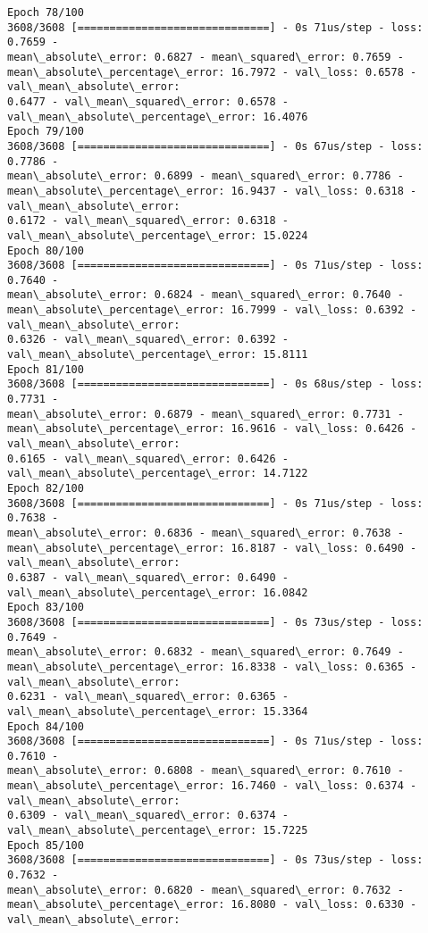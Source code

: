 \documentclass[11pt]{article}
\begin{document}
\begin{Verbatim}[commandchars=\\\{\},fontsize=\footnotesize]
Epoch 78/100
3608/3608 [==============================] - 0s 71us/step - loss: 0.7659 -
mean\_absolute\_error: 0.6827 - mean\_squared\_error: 0.7659 -
mean\_absolute\_percentage\_error: 16.7972 - val\_loss: 0.6578 - val\_mean\_absolute\_error:
0.6477 - val\_mean\_squared\_error: 0.6578 - val\_mean\_absolute\_percentage\_error: 16.4076
Epoch 79/100
3608/3608 [==============================] - 0s 67us/step - loss: 0.7786 -
mean\_absolute\_error: 0.6899 - mean\_squared\_error: 0.7786 -
mean\_absolute\_percentage\_error: 16.9437 - val\_loss: 0.6318 - val\_mean\_absolute\_error:
0.6172 - val\_mean\_squared\_error: 0.6318 - val\_mean\_absolute\_percentage\_error: 15.0224
Epoch 80/100
3608/3608 [==============================] - 0s 71us/step - loss: 0.7640 -
mean\_absolute\_error: 0.6824 - mean\_squared\_error: 0.7640 -
mean\_absolute\_percentage\_error: 16.7999 - val\_loss: 0.6392 - val\_mean\_absolute\_error:
0.6326 - val\_mean\_squared\_error: 0.6392 - val\_mean\_absolute\_percentage\_error: 15.8111
Epoch 81/100
3608/3608 [==============================] - 0s 68us/step - loss: 0.7731 -
mean\_absolute\_error: 0.6879 - mean\_squared\_error: 0.7731 -
mean\_absolute\_percentage\_error: 16.9616 - val\_loss: 0.6426 - val\_mean\_absolute\_error:
0.6165 - val\_mean\_squared\_error: 0.6426 - val\_mean\_absolute\_percentage\_error: 14.7122
Epoch 82/100
3608/3608 [==============================] - 0s 71us/step - loss: 0.7638 -
mean\_absolute\_error: 0.6836 - mean\_squared\_error: 0.7638 -
mean\_absolute\_percentage\_error: 16.8187 - val\_loss: 0.6490 - val\_mean\_absolute\_error:
0.6387 - val\_mean\_squared\_error: 0.6490 - val\_mean\_absolute\_percentage\_error: 16.0842
Epoch 83/100
3608/3608 [==============================] - 0s 73us/step - loss: 0.7649 -
mean\_absolute\_error: 0.6832 - mean\_squared\_error: 0.7649 -
mean\_absolute\_percentage\_error: 16.8338 - val\_loss: 0.6365 - val\_mean\_absolute\_error:
0.6231 - val\_mean\_squared\_error: 0.6365 - val\_mean\_absolute\_percentage\_error: 15.3364
Epoch 84/100
3608/3608 [==============================] - 0s 71us/step - loss: 0.7610 -
mean\_absolute\_error: 0.6808 - mean\_squared\_error: 0.7610 -
mean\_absolute\_percentage\_error: 16.7460 - val\_loss: 0.6374 - val\_mean\_absolute\_error:
0.6309 - val\_mean\_squared\_error: 0.6374 - val\_mean\_absolute\_percentage\_error: 15.7225
Epoch 85/100
3608/3608 [==============================] - 0s 73us/step - loss: 0.7632 -
mean\_absolute\_error: 0.6820 - mean\_squared\_error: 0.7632 -
mean\_absolute\_percentage\_error: 16.8080 - val\_loss: 0.6330 - val\_mean\_absolute\_error:

\end{Verbatim}
\end{document}
